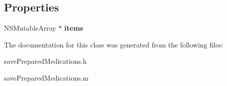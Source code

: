 \subsection*{Properties}
\begin{DoxyCompactItemize}
\item 
\hypertarget{interfacesave_prepared_medications_a7255286ddcb99b148ecb263b8ca76b25}{}N\+S\+Mutable\+Array $\ast$ {\bfseries items}\label{interfacesave_prepared_medications_a7255286ddcb99b148ecb263b8ca76b25}

\end{DoxyCompactItemize}


The documentation for this class was generated from the following files\+:\begin{DoxyCompactItemize}
\item 
save\+Prepared\+Medications.\+h\item 
save\+Prepared\+Medications.\+m\end{DoxyCompactItemize}
